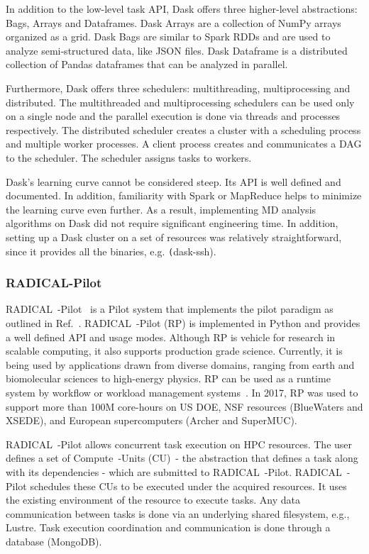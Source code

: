 In addition to the low-level task API, Dask offers three higher-level abstractions: Bags, Arrays and Dataframes.
Dask Arrays are a collection of NumPy arrays organized as a grid.
Dask Bags are similar to Spark RDDs and are used to analyze semi-structured data, like JSON files.
Dask Dataframe is a distributed collection of Pandas dataframes that can be analyzed in parallel.

Furthermore, Dask offers three schedulers: multithreading, multiprocessing and distributed.
The multithreaded and multiprocessing schedulers can be used only on a single node and the parallel execution is done via threads and processes respectively.
The distributed scheduler creates a cluster with a scheduling process and multiple worker processes.
A client process creates and communicates a DAG to the scheduler.
The scheduler assigns tasks to workers.

Dask's learning curve cannot be considered steep.
Its API is well defined and documented.
In addition, familiarity with Spark or MapReduce helps to minimize the learning curve even further.
As a result, implementing MD analysis algorithms on Dask did not require significant engineering time.
In addition, setting up a Dask cluster on a set of resources was relatively straightforward, since it provides all the binaries, e.g. \texttt(dask-ssh).

\subsubsection*{RADICAL-Pilot}
RADICAL~-Pilot~\cite{merzky2019using} is a Pilot system that implements the pilot paradigm as outlined in Ref.~\cite{turilli2018comprehensive}.
RADICAL~-Pilot (RP) is implemented in Python and provides a well defined API and usage modes.
Although RP is vehicle for research in scalable computing, it also supports production grade science.
Currently, it is being used by applications drawn from diverse domains, ranging from earth and biomolecular sciences to high-energy physics.
RP can be used as a runtime system by workflow or workload management systems~\cite{turilli2019middleware,treikalis2016repex,balasubramanian2018harnessing,dakka2018high,turilli2017evaluating}.
In 2017, RP was used to support more than 100M core-hours on US DOE, NSF resources (BlueWaters and XSEDE), and European supercomputers (Archer and SuperMUC).

RADICAL~-Pilot allows concurrent task execution on HPC resources.
The user defines a set of Compute~-Units (CU)~- the abstraction that defines a task along with its dependencies - which are submitted to RADICAL~-Pilot.
RADICAL~-Pilot schedules these CUs to be executed under the acquired resources.
It uses the existing environment of the resource to execute tasks.
Any data communication between tasks is done via an underlying shared filesystem, e.g., Lustre.
Task execution coordination and communication is done through a database (MongoDB).

